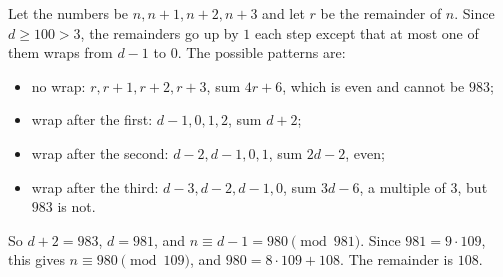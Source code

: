 Let the numbers be $n,n+1,n+2,n+3$ and let $r$ be the remainder of $n$. Since $d\ge100>3$, the remainders go up by $1$ each step except that at most one of them wraps from $d-1$ to $0$. The possible patterns are:
\begin{itemize}
\item no wrap: $r,r+1,r+2,r+3$, sum $4r+6$, which is even and cannot be $983$;
\item wrap after the first: $d-1,0,1,2$, sum $d+2$;
\item wrap after the second: $d-2,d-1,0,1$, sum $2d-2$, even;
\item wrap after the third: $d-3,d-2,d-1,0$, sum $3d-6$, a multiple of $3$, but $983$ is not.
\end{itemize}
So $d+2=983$, $d=981$, and $n\equiv d-1=980\pmod{981}$. Since $981=9\cdot109$, this gives $n\equiv980\pmod{109}$, and $980=8\cdot109+108$. The remainder is $\boxed{108}$.
